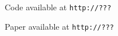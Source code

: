 \documentclass[landscape,a0b,final,a4resizeable]{include/a0poster}
\begin{document}
\begin{poster}
\begin{multicols}{3}
Code available at \texttt{http://???}

Paper available at \texttt{http://???}





\end{multicols}
\end{poster}
\end{document}
